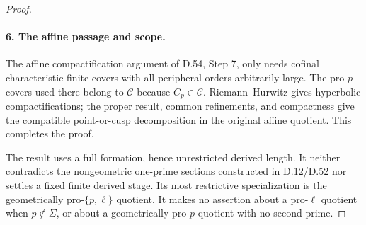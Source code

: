 \begin{proof}
\paragraph{6. The affine passage and scope.}

The affine compactification argument of D.54, Step 7, only needs
cofinal characteristic finite covers with all peripheral orders
arbitrarily large.  The pro-$p$ covers used there belong to
$\mathcal C$ because $C_p\in\mathcal C$.  Riemann--Hurwitz gives
hyperbolic compactifications; the proper result, common refinements,
and compactness give the compatible point-or-cusp decomposition
in the original affine quotient.  This completes the proof.

The result uses a full formation, hence unrestricted derived
length.  It neither contradicts the nongeometric one-prime
sections constructed in D.12/D.52 nor settles a fixed finite
derived stage.  Its most restrictive specialization is the
geometrically pro-$\{p,\ell\}$ quotient.  It makes no assertion
about a pro-$\ell$ quotient when $p\notin\Sigma$, or about a
geometrically pro-$p$ quotient with no second prime.
\end{proof}
